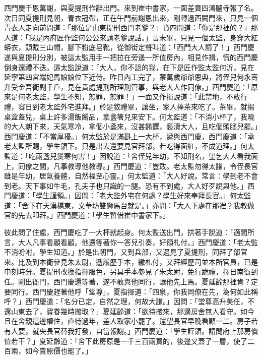 西門慶千恩萬謝，與夏提刑作辭出門。來到崔中書家，一面差賁四鴻臚寺報了名。次日同夏提刑見朝，青衣冠帶，正在午門前謝恩出來，剛轉過西闕門來，只見一個青衣人走向前問道：「那位是山東提刑西門老爹？」賁四問道：「你是那裡的？」那人道：「我是內府匠作監何公公來請老爹說話。」言未畢，只見一個太監，身穿大紅蟒衣，頭戴三山帽，腳下粉底皂靴，從御街定聲叫道：「西門大人請了！」西門慶遂與夏提刑分別，被這太監用手一把拉在旁邊一所值房內，相見作揖，慌的西門慶倒身還禮不迭。這太監說道：「大人，你不認的我，在下是匠作監太監何沂，見在延寧第四宮端妃馬娘娘位下近侍。昨日內工完了，蒙萬歲爺爺恩典，將侄兒何永壽升受金吾衛副千戶，見在貴處提刑所理刑管事，與老大人作同僚。」西門慶道：「原來是何老太監，學生不知，恕罪，恕罪！」一面又作揖說道：「此禁地，不敢行禮，容日到老太監外宅進拜。」於是敘禮畢，讓坐，家人捧茶來吃了。茶畢，就揭桌盒蓋兒，桌上許多湯飯餚品，拿盞箸兒來安下。何太監道：「不消小杯了，我曉的大人朝下來，天氣寒冷，拿個小盞來，沒甚餚饌，褻瀆大人，且吃個頭腦兒罷。」西門慶道：「不當厚擾。」何太監於是滿斟上一大杯，遞與西門慶，西門慶道：「承老太監所賜，學生領下。只是出去還要見官拜部，若吃得面紅，不成道理。」何太監道：「吃兩盞兒燙寒何害！」因說道：「舍侄兒年幼，不知刑名，望乞大人看我面上，同僚之間，凡事教導他教導。」西門慶道：「豈敢。老太監勿得太謙，令侄長官雖是年幼，居氣養體，自然福至心靈。」何太監道：「大人好說。常言：學到老不會到老。天下事如牛毛，孔夫子也只識的一腿。恐有不到處，大人好歹說與他。」西門慶道：「學生謹領。」因問：「老大監外宅在何處？學生好來奉拜長官。」何太監道：「舍下在天漢橋東，文華坊雙獅馬台就是。」亦問：「大人下處在那裡？我教做官的先去叩拜。」西門慶道：「學生暫借崔中書家下。」

彼此問了住處，西門慶吃了一大杯就起身。何太監送出門，拱著手說道：「適間所言，大人凡事看顧看顧。他還等著你一答兒引奏，好領札付。」西門慶道：「老太監不消吩咐，學生知道。」於是出朝門，又到兵部，又遇見了夏提刑，同拜了部官來。比及到本衛參見朱太尉，遞履歷手本，繳札付，又拜經歷司並本所官員，已是申刻時分。夏提刑改換指揮服色，另具手本參見了朱太尉，免行跪禮，擇日南衙到任。剛出衙門，西門慶還等著，遂不敢與他同行，讓他先上馬。夏延齡那裡肯？定要同行。西門慶趕著他呼「堂尊」，夏指揮道：「四泉，你我同僚在先，為何如此稱呼？」西門慶道：「名分已定，自然之理，何故大謙。」因問：「堂尊高升美任，不還山東去了，寶眷幾時搬取？」夏延齡道：「欲待搬來，那邊房舍無人看守。如今且在舍親這邊權住，直待過年，差人取家小罷了。還望長官早晚看顧一二。房子若有人要，就央長官替我打發，自當報謝。」西門慶道：「學生謹領。請問府上那房價值若干？」夏延齡道：「舍下此房原是一千三百兩買的，後邊又蓋了一層，使了二百兩，如今賣原價也罷了。」

